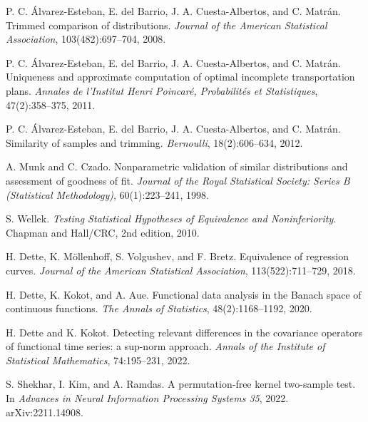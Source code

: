 
P. C. {\'A}lvarez-Esteban, E. del Barrio, J. A. Cuesta-Albertos, and C. Matr{\'a}n.
\newblock Trimmed comparison of distributions.
\newblock \emph{Journal of the American Statistical Association}, 103(482):697--704, 2008.

P. C. {\'A}lvarez-Esteban, E. del Barrio, J. A. Cuesta-Albertos, and C. Matr{\'a}n.
\newblock Uniqueness and approximate computation of optimal incomplete transportation plans.
\newblock \emph{Annales de l'Institut Henri Poincar\'e, Probabilit\'es et Statistiques}, 47(2):358--375, 2011.

P. C. {\'A}lvarez-Esteban, E. del Barrio, J. A. Cuesta-Albertos, and C. Matr{\'a}n.
\newblock Similarity of samples and trimming.
\newblock \emph{Bernoulli}, 18(2):606--634, 2012.

A. Munk and C. Czado.
\newblock Nonparametric validation of similar distributions and assessment of goodness of fit.
\newblock \emph{Journal of the Royal Statistical Society: Series B (Statistical Methodology)}, 60(1):223--241, 1998.

S. Wellek.
\newblock \emph{Testing Statistical Hypotheses of Equivalence and Noninferiority}.
\newblock Chapman and Hall/CRC, 2nd edition, 2010.

H. Dette, K. M\"ollenhoff, S. Volgushev, and F. Bretz.
\newblock Equivalence of regression curves.
\newblock \emph{Journal of the American Statistical Association}, 113(522):711--729, 2018.

H. Dette, K. Kokot, and A. Aue.
\newblock Functional data analysis in the Banach space of continuous functions.
\newblock \emph{The Annals of Statistics}, 48(2):1168--1192, 2020.

H. Dette and K. Kokot.
\newblock Detecting relevant differences in the covariance operators of functional time series: a sup-norm approach.
\newblock \emph{Annals of the Institute of Statistical Mathematics}, 74:195--231, 2022.

S. Shekhar, I. Kim, and A. Ramdas.
\newblock A permutation-free kernel two-sample test.
\newblock In \emph{Advances in Neural Information Processing Systems 35}, 2022. arXiv:2211.14908.

